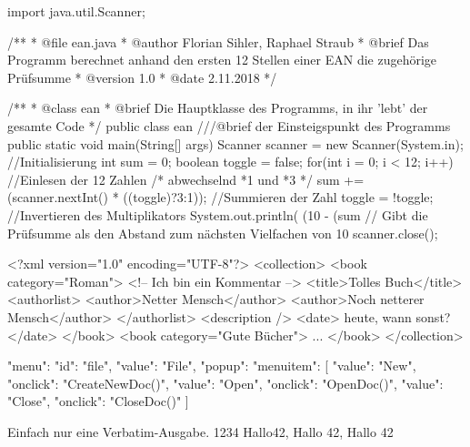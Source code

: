 \documentclass{sopra-base}
\begin{document}
\begin{java}
import java.util.Scanner;
 
/**
 *  @file ean.java
 *  @author Florian Sihler, Raphael Straub
 *  @brief Das Programm berechnet anhand den ersten 12 Stellen einer EAN die zugehörige Prüfsumme
 *  @version 1.0
 *  @date 2.11.2018
 */

/**
 * @class ean
 * @brief Die Hauptklasse des Programms, in ihr 'lebt' der gesamte Code
 */
public class ean {
    ///@brief der Einsteigspunkt des Programms
    public static void main(String[] args){
        Scanner scanner = new Scanner(System.in); //Initialisierung 
        int sum = 0; boolean toggle = false;
        for(int i = 0; i < 12; i++){ //Einlesen der 12 Zahlen
                                         /* abwechselnd *1 und *3 */
            sum += (scanner.nextInt() * ((toggle)?3:1)); //Summieren der Zahl
            toggle = !toggle; //Invertieren des Multiplikators
        } 
        System.out.println( (10 - (sum %
        // Gibt die Prüfsumme als den Abstand zum nächsten Vielfachen von 10
        scanner.close();
    }
}
\end{java}

\begin{xml*}[morekeywords={[3]{collection,book,title,authorlist,description,date,author}}]
<?xml version="1.0" encoding="UTF-8"?>
<collection>
    <book category="Roman">
        <!-- Ich bin ein Kommentar -->
        <title>Tolles Buch</title>
        <authorlist>
            <author>Netter Mensch</author>
            <author>Noch netterer Mensch</author>
        </authorlist>
        <description />
        <date> heute, wann sonst? </date>
    </book>
    <book category="Gute Bücher">
        ...
    </book>
</collection>
\end{xml*}

\begin{json}
{"menu": {
  "id": "file",
  "value": "File",
  "popup": {
    "menuitem": [
      {"value": "New", "onclick": "CreateNewDoc()"},
      {"value": "Open", "onclick": "OpenDoc()"},
      {"value": "Close", "onclick": "CloseDoc()"}
    ]
  }
}}
\end{json}

\begin{void}
Einfach nur eine Verbatim-Ausgabe. 1234 Hallo42, Hallo 42, Hallo 42
\end{void}
\end{document}
